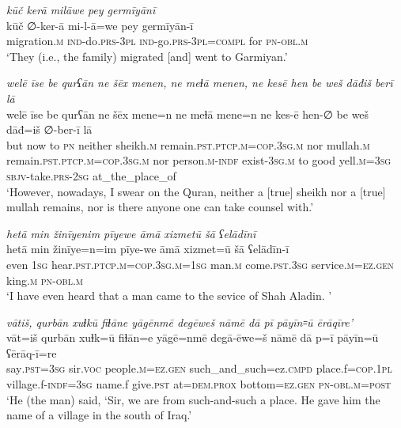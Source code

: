 \ea \label{ZB.39}
\textit{kūč kerā milāwe pey germīyānī} \\ 
\gll kūč ∅-ker-ā mi-l-ā=we pey germīyān-ī \\ 
 migration\textsc{.m} \textsc{ind-}do\textsc{.prs}\textsc{-3pl} \textsc{ind-}go\textsc{.prs}\textsc{-3pl}\textsc{=compl} for \textsc{pn}\textsc{-obl}\textsc{.m} \\ 
\glt `They (i.e., the family) migrated [and] went to Garmiyan.'
\z 
 
\ea \label{ZB.60}
\textit{welē īse be qurʕān ne šēx menen, ne meɫā menen, ne kesē hen be weš dāđiš berī lā} \\ 
\gll welē īse be qurʕān ne šēx mene=n ne meɫā mene=n ne kes-ē hen-∅ be weš dāđ=iš ∅-ber-ī lā \\ 
 but now to \textsc{pn} neither sheikh\textsc{.m} remain\textsc{.pst}\textsc{.ptcp}\textsc{.m}\textsc{=cop}\textsc{.3sg}\textsc{.m} nor mullah\textsc{.m} remain\textsc{.pst}\textsc{.ptcp}\textsc{.m}\textsc{=cop}\textsc{.3sg}\textsc{.m} nor person\textsc{.m}\textsc{-indf} exist\textsc{-3sg}\textsc{.m} to good yell\textsc{.m}\textsc{=3sg} \textsc{sbjv-}take\textsc{.prs}-\textsc{2sg} at\_the\_place\_of \\ 
\glt `However, nowadays, I swear on the Quran, neither a [true] sheikh nor a [true] mullah remains, nor is there anyone one can take counsel with.'
\z 
 
\ea \label{ZQ.2}
\textit{hetā min žinīyenim pīyewe āmā xizmetū šā ʕelādīnī} \\ 
\gll hetā min žinīye=n=im pīye-we āmā xizmet=ū šā ʕelādīn-ī \\ 
 even \textsc{1sg} hear\textsc{.pst}\textsc{.ptcp}\textsc{.m}\textsc{=cop}\textsc{.3sg}\textsc{.m}\textsc{=\textsc{1sg}} man\textsc{.m} come\textsc{.pst}\textsc{.3sg} service\textsc{.m}\textsc{=ez.gen} king\textsc{.m} \textsc{pn}\textsc{-obl}\textsc{.m} \\ 
\glt `I have even heard that a man came to the sevice of Shah Aladin. '
\z 
 
\ea \label{ZQ.5}
\textit{vātiš, qurbān xuɫkū fiɫāne yāgēnmē degēweš nāmē dā pī pāyīn꞊ū ērāqīre'} \\ 
\gll vāt=iš qurbān xuɫk=ū fiɫān=e yāgē=nmē degā-ēwe=š nāmē dā p=ī pāyīn=ū ʕērāq-ī=re \\ 
 say\textsc{.pst}\textsc{=3sg} sir.\textsc{voc} people\textsc{.m}\textsc{=ez.gen} such\_and\_such=ez\textsc{.cmpd} place.f\textsc{=cop}\textsc{.\textsc{1pl}} village.f\textsc{-indf}\textsc{=3sg} name.f give\textsc{.pst} at=\textsc{dem.prox} bottom\textsc{=ez.gen} \textsc{pn}\textsc{-obl}\textsc{.m}\textsc{=\textsc{post}} \\ 
\glt `He (the man) said, ‘Sir, we are from such-and-such a place. He gave him the name of a village in the south of Iraq.'
\z 
 

